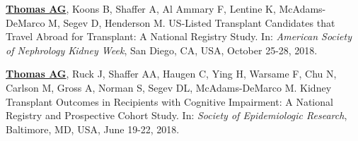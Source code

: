 \documentclass[10pt]{article}
\makeatletter
\newlength{\bibhang}
\newlength{\bibsep}
 {\@listi \global\bibsep\itemsep \global\advance\bibsep by\parsep}
\newenvironment{bibenum*}
  {\renewcommand\labelenumi{[\theenumi]}%
   \etaremune[
     topsep=0pt,
     itemsep=\bibsep,
     parsep=0pt,partopsep=0pt,
     itemindent=-\bibhang,
     leftmargin={\bibhang+\widthof{[999]}}]}
  {\endetaremune}
\makeatother
\begin{document}
\begin{bibenum*}



\item \underline{\textbf{Thomas AG}}, Koons B, Shaffer A, Al Ammary F,
  Lentine K, McAdams-DeMarco M, Segev D, Henderson M.
  US-Listed Transplant Candidates that Travel Abroad for Transplant:
  A National Registry Study.
  In: \emph{American Society of Nephrology Kidney Week},
  San Diego, CA, USA, October 25-28, 2018.



\item \underline{\textbf{Thomas AG}}, Ruck J, Shaffer AA, Haugen C,
  Ying H, Warsame F, Chu N, Carlson M, Gross A, Norman S, Segev DL,
  McAdams-DeMarco M.
  Kidney Transplant Outcomes in Recipients with Cognitive Impairment:
  A National Registry and Prospective Cohort Study.
  In: \emph{Society of Epidemiologic Research},
  Baltimore, MD, USA, June 19-22, 2018.


\end{bibenum*}
\end{document}
